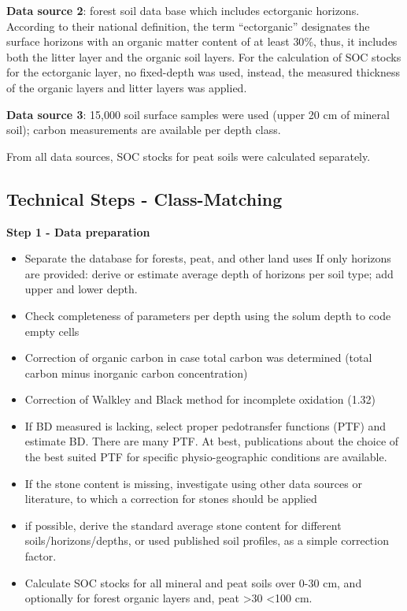 \documentclass[10pt,b5paper,]{book}
\providecommand{\tightlist}{%
  \setlength{\itemsep}{0pt}\setlength{\parskip}{0pt}}
\theoremstyle{definition}
\theoremstyle{definition}
\theoremstyle{definition}
\theoremstyle{remark}
\begin{document}
\textbf{Data source 2}: forest soil data base which includes ectorganic
horizons. According to their national definition, the term
``ectorganic'' designates the surface horizons with an organic matter
content of at least \(30\%\), thus, it includes both the litter layer
and the organic soil layers. For the calculation of SOC stocks for the
ectorganic layer, no fixed-depth was used, instead, the measured
thickness of the organic layers and litter layers was applied.

\textbf{Data source 3}: 15,000 soil surface samples were used (upper 20
cm of mineral soil); carbon measurements are available per depth class.

From all data sources, SOC stocks for peat soils were calculated
separately.

\hypertarget{technical-steps---class-matching}{%
\subsection{Technical Steps -
Class-Matching}\label{technical-steps---class-matching}}

\textbf{Step 1 - Data preparation}

\begin{itemize}
\tightlist
\item
  Separate the database for forests, peat, and other land uses If only
  horizons are provided: derive or estimate average depth of horizons
  per soil type; add upper and lower depth.
\item
  Check completeness of parameters per depth using the solum depth to
  code empty cells
\item
  Correction of organic carbon in case total carbon was determined
  (total carbon minus inorganic carbon concentration)
\item
  Correction of Walkley and Black method for incomplete oxidation (1.32)
\item
  If BD measured is lacking, select proper pedotransfer functions (PTF)
  and estimate BD. There are many PTF. At best, publications about the
  choice of the best suited PTF for specific physio-geographic
  conditions are available.
\item
  If the stone content is missing, investigate using other data sources
  or literature, to which a correction for stones should be applied
\item
  if possible, derive the standard average stone content for different
  soils/horizons/depths, or used published soil profiles, as a simple
  correction factor.
\item
  Calculate SOC stocks for all mineral and peat soils over 0-30 cm, and
  optionally for forest organic layers and, peat \textgreater{}30
  \textless{}100 cm.
\end{itemize}
\end{document}

